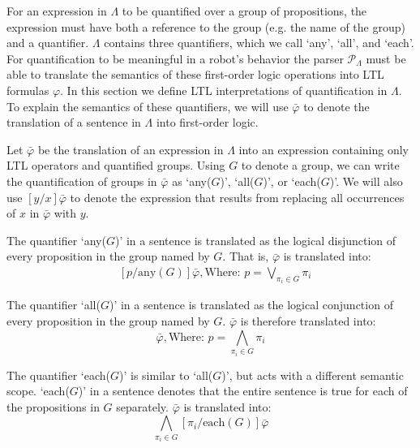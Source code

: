 For an expression in $\Lambda$ to be quantified over a group of propositions, the expression must have both a reference to the group (e.g. the name of the group) and a quantifier. 
$\Lambda$ contains three quantifiers, which we call `any', `all', and `each'. 
For quantification to be meaningful in a robot's behavior the parser $\mathcal{P}_{\Lambda}$ must be able to translate the semantics of these first-order logic operations into LTL formulas $\varphi$.
In this section we define LTL interpretations of quantification in $\Lambda$.  
To explain the semantics of these quantifiers, we will use $\bar{\varphi}$ to denote the translation of a sentence in $\Lambda$ into first-order logic. 
\par Let $\bar{\varphi}$ be the translation of an expression in $\Lambda$ into an expression containing only LTL operators and quantified groups. 
Using $G$ to denote a group, we can write the quantification of groups in $\bar{\varphi}$ as `any($G$)', `all($G$)', or `each($G$)'. 
We will also use $[y/x]\bar{\varphi}$ to denote the expression that results from replacing all occurrences of $x$ in $\bar{\varphi}$ with $y$. 
\par
The quantifier `any($G$)' in a sentence is translated as the logical disjunction of every proposition in the group named by $G$. 
That is, $\bar{\varphi}$ is translated into: 
\begin{align*}
	&[ p / \text{any}(G)] \bar{\varphi}, \text{Where: } p = \bigvee \limits_{\pi_i \in G} \pi_i
\end{align*}
\par
The quantifier `all($G$)' in a sentence is translated as the logical conjunction of every proposition in the group named by $G$. 
$\bar{\varphi}$ is therefore translated into: 
\begin{equation*}
	[ p / \text{all}(G)] \bar{\varphi}, \text{Where: } p = \bigwedge \limits_{\pi_i \in G} \pi_i
\end{equation*}
\par
The quantifier `each($G$)' is similar to `all($G$)', but acts with a different semantic scope. 
`each($G$)' in a sentence denotes that the entire sentence is true for each of the propositions in $G$ separately. 
$\bar{\varphi}$ is translated into:
\begin{equation*}
 	\bigwedge\limits_{\pi_i \in G} [\pi_i / \text{each}(G)] \bar{\varphi}
\end{equation*}
\par
